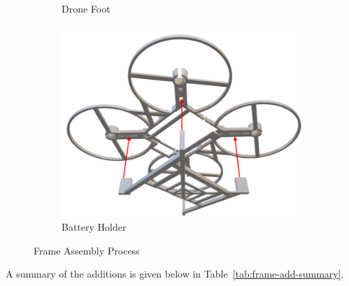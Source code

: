 \begin{figure}[H]
\begin{subfigure}[b]{0.35\textwidth}
        \caption{Drone Foot}
    \end{subfigure}
    \begin{subfigure}[b]{0.35\textwidth}
        \centering
        \includegraphics[width=\textwidth]{img/assembly-8.png}
        \caption{Battery Holder}
    \end{subfigure}
    \caption{Frame Assembly Process}
\end{figure}

\pagebreak
A summary of the additions is given below in Table~\ref{tab:frame-add-summary}.

